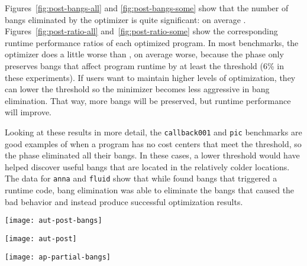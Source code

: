 Figures~\ref{fig:post-bangs-all} and \ref{fig:post-bangs-some} show
that the number of bangs eliminated by the \Postopt{} optimizer is quite
significant: on average \postBangs{}. Figures~\ref{fig:post-ratio-all}
and~\ref{fig:post-ratio-some} show the corresponding runtime
performance ratios of each optimized program. In most benchmarks,
the \Postopt{} optimizer does
a little worse than \Ao{}, on average \postRatioWorse{} worse, because
the \postopt{} phase only preserves bangs that affect program
runtime by at least the \absim{} threshold (6\% in these experiments).
If users want to
maintain higher levels of optimization,
they can lower the \absim{} threshold so the minimizer becomes less
aggressive in bang elimination. That way, more bangs will be
preserved, but runtime performance will
improve.

Looking at these results in more detail,
the \texttt{callback001} and \texttt{pic} benchmarks are good
examples of when a program has no cost centers that meet
the \hotspotcost{} threshold, so the \postopt{} phase eliminated all their bangs.
In these cases, a lower threshold would have
helped discover useful bangs that are located in the relatively colder locations.
The data for \texttt{anna} and \texttt{fluid}
show that while \Ao{} found bangs that triggered a \nonterm{} runtime
code, \postopt{} bang elimination was able to eliminate
the \dangerous{} bangs that caused the bad behavior and instead produce
successful optimization results.

\begin{figure*}
\texttt{[image: aut-post-bangs]}
\label{fig:post-bangs-all}
\end{figure*}

\begin{figure*}
\texttt{[image: aut-post]}
\label{fig:post-ratio-all}
\end{figure*}

\begin{figure*}
\texttt{[image: ap-partial-bangs]}
\label{fig:post-bangs-some}
\end{figure*}

